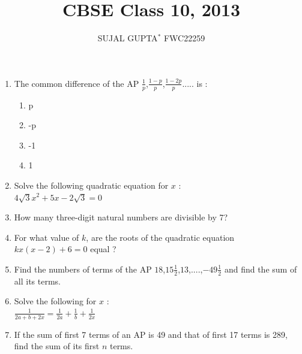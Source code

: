 \documentclass[10pt,-letter paper]{article}
\begin{document}
\author{SUJAL GUPTA$^{*}$ FWC22259}
\title{CBSE Class 10, 2013}

\maketitle

\bigskip


\begin{enumerate}
\section{Algebra}
\item The common difference of the AP $\frac{1}{p}$,$\frac{1-p}{p}$,$\frac{1-2p}{p}$..... is :
 \begin{enumerate}
    \item p\\
    \item -p\\
    \item -1\\
    \item 1 \\
 \end{enumerate}
 \item Solve the following quadratic equation for $x$ :\\ $4\sqrt{3}x^2+5x-2\sqrt{3}=0$
\item How many three-digit natural numbers are divisible by 7?
\item For what value of $k$, are the roots of the quadratic equation $kx (x-2) + 6 = 0$ equal ?
\item Find the numbers of terms of the AP $18$,$15\frac{1}{2}$,$13$,....,$-49\frac{1}{2}$ and find the sum of all its terms.
\item Solve the following for $x$ : \\
$\frac{1}{2a+b+2x}=\frac{1}{2a}+\frac{1}{b}+\frac{1}{2x}$ \\
\item If the sum of first 7 terms of an AP is 49 and that of first 17 terms is 289, find the sum of its first $n$ terms. 

\end{enumerate}
\end{document}
